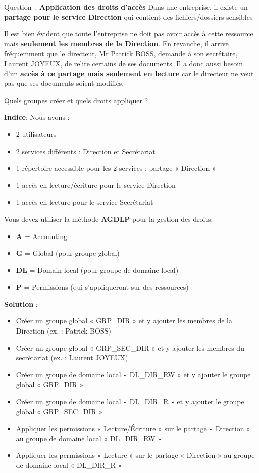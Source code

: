 \newpage

Question~: \textbf{Application des droits d'accès}
\noindent Dans une entreprise, il existe un \textbf{partage pour le service Direction} qui contient des fichiers/dossiers sensibles

\noindent Il est bien évident que toute l’entreprise ne doit pas avoir accès à cette ressource mais \textbf{seulement les membres de la Direction}. En revanche, il arrive fréquemment que le directeur, Mr Patrick BOSS, demande à son secrétaire, Laurent JOYEUX, de relire certains de ses documents. Il a donc aussi besoin d’un \textbf{accès à ce partage mais seulement en lecture} car le directeur ne veut pas que ses documents soient modifiés.

\noindent Quels groupes créer et quels droits appliquer ?

\textbf{Indice}:
\noindent Nous avons :
\begin{itemize}
	\item 2 utilisateurs
	\item 2 services différents : Direction et Secrétariat
	\item 1 répertoire accessible pour les 2 services : partage « Direction »
	\item 1 accès en lecture/écriture pour le service Direction
	\item 1 accès en lecture pour le service Secrétariat
\end{itemize} 

Vous devez utiliser la méthode \textbf{AGDLP} pour la gestion des droits.
\begin{itemize}
	\item \textbf{A} = Accounting
	\item \textbf{G} = Global (pour groupe global)
	\item \textbf{DL} = Domain local (pour groupe de domaine local)
	\item \textbf{P} = Permissions (qui s’appliqueront sur des ressources)
\end{itemize}

\vspace{0.5cm}

\noindent \textbf{Solution} :
\begin{itemize}
	\item Créer un groupe global « GRP\_DIR » et y ajouter les membres de la Direction (ex. : Patrick BOSS)
	\item Créer un groupe global « GRP\_SEC\_DIR » et y ajouter les membres du secrétariat (ex. : Laurent JOYEUX)
	\item Créer un groupe de domaine local « DL\_DIR\_RW » et y ajouter le groupe global « GRP\_DIR »
	\item Créer un groupe de domaine local « DL\_DIR\_R » et y ajouter le groupe global « GRP\_SEC\_DIR »
	\item Appliquer les permissions « Lecture/Écriture » sur le partage « Direction » au groupe de domaine local « DL\_DIR\_RW »
	\item Appliquer les permissions « Lecture » sur le partage « Direction » au groupe de domaine local « DL\_DIR\_R »
\end{itemize}

